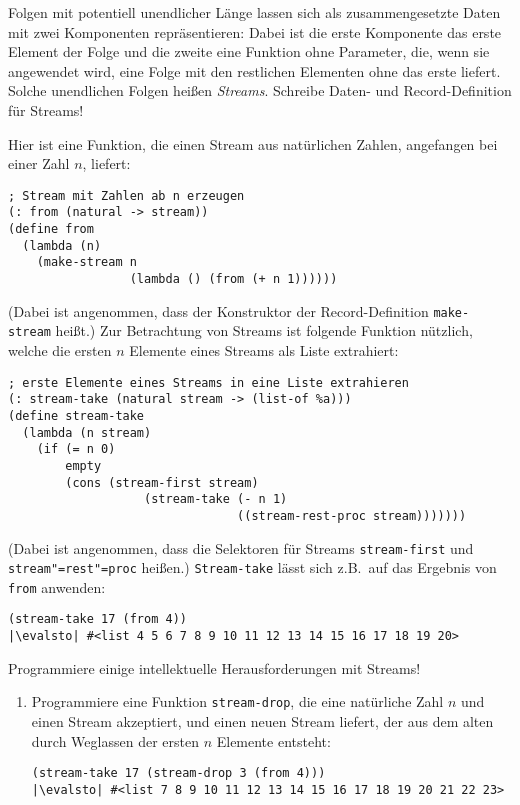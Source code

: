\begin{aufgabe}
  Folgen mit potentiell unendlicher Länge lassen sich als
  zusammengesetzte Daten mit zwei Komponenten repräsentieren: Dabei
  ist die erste Komponente das erste Element der Folge und die zweite
  eine Funktion ohne Parameter, die, wenn sie angewendet wird, eine Folge mit
  den restlichen Elementen ohne das erste liefert.
  Solche unendlichen Folgen heißen \textit{Streams}.
  Schreibe Daten- und Record-Definition für Streams!

  Hier ist eine Funktion, die einen Stream aus natürlichen Zahlen,
  angefangen bei einer Zahl $n$, liefert:
  \begin{lstlisting}
; Stream mit Zahlen ab n erzeugen
(: from (natural -> stream))
(define from
  (lambda (n)
    (make-stream n
                 (lambda () (from (+ n 1))))))
  \end{lstlisting}
  (Dabei ist angenommen, dass der Konstruktor der Record-Definition
  \texttt{make-stream} heißt.)
  Zur Betrachtung von Streams ist folgende Funktion nützlich, welche
  die ersten $n$ Elemente eines Streams als Liste extrahiert:
  \begin{lstlisting}
; erste Elemente eines Streams in eine Liste extrahieren
(: stream-take (natural stream -> (list-of %a)))
(define stream-take
  (lambda (n stream)
    (if (= n 0)
        empty
        (cons (stream-first stream)
                   (stream-take (- n 1)
                                ((stream-rest-proc stream)))))))
   \end{lstlisting}
   (Dabei ist angenommen, dass die Selektoren für Streams
   \texttt{stream-first} und \texttt{stream"=rest"=proc} heißen.)
   \texttt{Stream-take} lässt sich z.B.\ auf das Ergebnis von
   \texttt{from} anwenden:
   \begin{lstlisting}
(stream-take 17 (from 4))
|\evalsto| #<list 4 5 6 7 8 9 10 11 12 13 14 15 16 17 18 19 20>
   \end{lstlisting}
   Programmiere einige intellektuelle Herausforderungen mit Streams!
   \begin{enumerate}
   \item Programmiere eine Funktion \texttt{stream-drop}, die eine
     natürliche Zahl $n$ und einen Stream akzeptiert, und einen neuen
     Stream liefert, der aus dem alten durch Weglassen der ersten $n$
     Elemente entsteht:
     \begin{lstlisting}
(stream-take 17 (stream-drop 3 (from 4)))
|\evalsto| #<list 7 8 9 10 11 12 13 14 15 16 17 18 19 20 21 22 23>

\end{lstlisting}
\end{enumerate}
\end{aufgabe}
